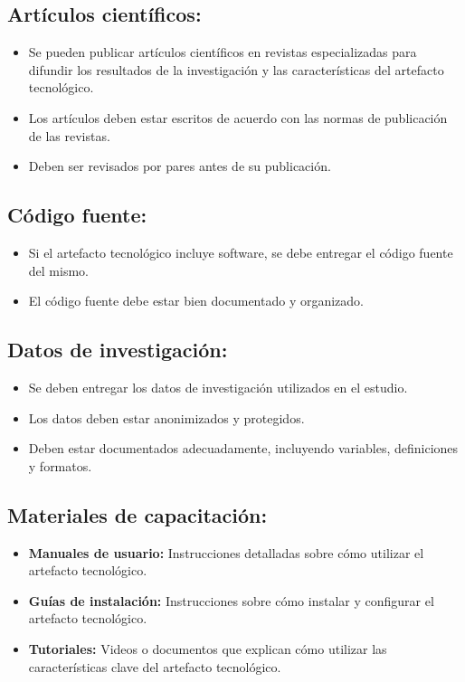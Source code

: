 \documentclass{article}
\begin{document}
\subsection{Artículos científicos:}
\begin{itemize}
  \item Se pueden publicar artículos científicos en revistas especializadas para difundir los resultados de la investigación y las características del artefacto tecnológico.
  \item Los artículos deben estar escritos de acuerdo con las normas de publicación de las revistas.
  \item Deben ser revisados por pares antes de su publicación.
\end{itemize}

\subsection{Código fuente:}
\begin{itemize}
  \item Si el artefacto tecnológico incluye software, se debe entregar el código fuente del mismo.
  \item El código fuente debe estar bien documentado y organizado.
\end{itemize}

\subsection{Datos de investigación:}
\begin{itemize}
  \item Se deben entregar los datos de investigación utilizados en el estudio.
  \item Los datos deben estar anonimizados y protegidos.
  \item Deben estar documentados adecuadamente, incluyendo variables, definiciones y formatos.
\end{itemize}

\subsection{Materiales de capacitación:}
\begin{itemize}
  \item \textbf{Manuales de usuario:} Instrucciones detalladas sobre cómo utilizar el artefacto tecnológico.
  \item \textbf{Guías de instalación:} Instrucciones sobre cómo instalar y configurar el artefacto tecnológico.
  \item \textbf{Tutoriales:} Videos o documentos que explican cómo utilizar las características clave del artefacto tecnológico.
\end{itemize}
\end{document}
